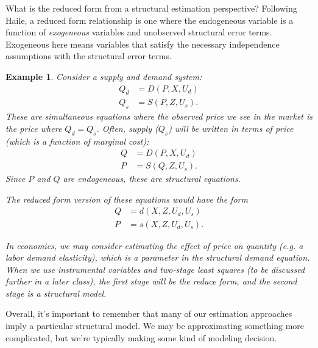 \documentclass{tufte-handout}
\theoremstyle{break}
\newtheorem{exmp}{Example}
\begin{document}
What is the reduced form from a structural estimation perspective? Following Haile, a reduced form relationship is one where the endogeneous variable is a function of \emph{exogeneous} variables and unobserved structural error terms. Exogeneous here means variables that satisfy the necessary independence assumptions with the structural error terms.



\begin{boxD}
  \begin{exmp}
Consider a supply and demand system:
\begin{align*}
  Q_{d} &= D(P, X, U_{d})\\
  Q_{s} &= S(P, Z, U_{s}).
\end{align*}
These are simultaneous equations where the observed price we see in the market is the price where $Q_{d} = Q_{s}$. 
Often, supply ($Q_{s}$) will be written in terms of price (which is a function of marginal cost):
\begin{align*}
  Q &= D(P, X, U_{d})\\
  P &= S(Q, Z, U_{s}).
\end{align*}
Since $P$ and $Q$ are endogeneous, these are \emph{structural} equations. 
\linebreak

The reduced form version of these equations would have the form
\begin{align*}
  Q &= d(X, Z, U_{d}, U_{s})\\
 P &= s(X, Z, U_{d}, U_{s}).
\end{align*}

In economics, we may consider estimating the effect of price on quantity (e.g. a labor demand elasticity), which is a parameter in the structural demand equation. When we use instrumental variables and two-stage least squares (to be discussed further in a later class), the \emph{first stage} will be the reduce form, and the second stage is a structural model.
  \end{exmp}
  \end{boxD}

Overall, it's important to remember that many of our estimation approaches imply a particular structural model. We may be approximating something more complicated, but we're typically making some kind of modeling decision.
\end{document}

